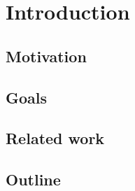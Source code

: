 \chapter{Introduction}

\section{Motivation}

\section{Goals}

\section{Related work}

\section{Outline}

